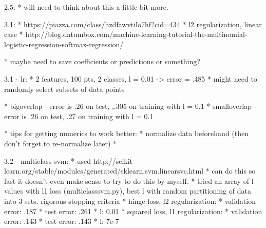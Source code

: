 \documentclass[10pt]{article}
\begin{document}
2.5:
* will need to think about this a little bit more.

3.1:
* https://piazza.com/class/hzdfawvtilo7hf?cid=434
* l2 regularization, linear case
* http://blog.datumbox.com/machine-learning-tutorial-the-multinomial-logistic-regression-softmax-regression/

* maybe need to save coefficients or predictions or something?

3.1 - lr:
* 2 features, 100 pts, 2 classes, l = 0.01 -> error = .485
* might need to randomly select subsets of data points

* bigoverlap - error is .26 on test, ,.305 on training with l = 0.1
* smalloverlap - error is .26 on test, .27 on training with l = 0.1

* tips for getting numerics to work better:
	* normalize data beforehand (then don't forget to re-normalize later)
	* 

3.2 - multiclass svm:
* used http://scikit-learn.org/stable/modules/generated/sklearn.svm.linearsvc.html
* can do this so fast it doesn't even make sense to try to do this by myself.
* tried an array of l values with l1 loss (multiclasssvm.py), best l with random partitioning of data into 3 sets. rigorous stopping criteria
* hinge loss, l2 regularization: 
	* validation error: .187
	* test error: .261
	* l: 0.01
* squared loss, l1 regularization:
	* validation error: .143
	* test error: .143
	* l: 7e-7
\end{document}
